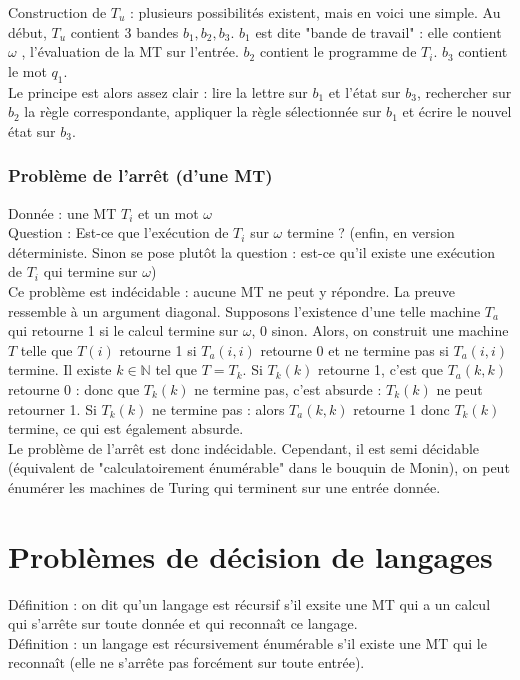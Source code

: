 \documentclass{article}
\newcommand{\N}{\mathbb{N}}
\begin{document}
Construction de $T_u$ : plusieurs possibilités existent, mais en voici une simple. Au début, $T_u$ contient 3 bandes $b_1, b_2, b_3$. $b_1$ est dite "bande de travail" : elle contient $\omega$ , l'évaluation de la MT sur l'entrée.  $b_2$ contient le programme de $T_i$. $b_3$ contient le mot $q_1$. \\
Le principe est alors assez clair : lire la lettre sur $b_1$ et l'état sur $b_3$, rechercher sur $b_2$ la règle correspondante, appliquer la règle sélectionnée sur $b_1$ et écrire le nouvel état sur $b_3$. \\ 

\subsubsection{Problème de l'arrêt (d'une MT)}

Donnée : une MT $T_i$ et un mot $\omega$ \\ 
Question : Est-ce que l'exécution de $T_i$ sur $\omega$ termine ? (enfin, en version déterministe. Sinon se pose plutôt la question : est-ce qu'il existe une exécution de $T_i$ qui termine sur $\omega$) \\

Ce problème est indécidable : aucune MT ne peut y répondre. La preuve ressemble à un argument diagonal. Supposons l'existence d'une telle machine $T_a$ qui retourne 1 si le calcul termine sur $\omega$, 0 sinon. Alors, on construit une machine $T$ telle que $T(i)$ retourne 1 si $T_a(i,i)$ retourne 0 et ne termine pas si $T_a(i,i)$ termine. Il existe $k \in \N$ tel que $T = T_k$. Si $T_k(k)$ retourne 1, c'est que $T_a(k,k)$ retourne 0 : donc que $T_k(k)$ ne termine pas, c'est absurde : $T_k(k)$ ne peut retourner 1. Si $T_k(k)$ ne termine pas : alors $T_a(k,k)$ retourne 1 donc $T_k(k)$ termine, ce qui est également absurde.  \\ 

Le problème de l'arrêt est donc indécidable. Cependant, il est semi décidable (équivalent de "calculatoirement énumérable" dans le bouquin de Monin), on peut énumérer les machines de Turing qui terminent sur une entrée donnée. 

\section{Problèmes de décision de langages}

Définition : on dit qu'un langage est récursif s'il exsite une MT qui a un calcul qui s'arrête sur toute donnée et qui reconnaît ce langage. \\ 
Définition : un langage est récursivement énumérable s'il existe une MT qui le reconnaît (elle ne s'arrête pas forcément sur toute entrée). \\
\end{document}
